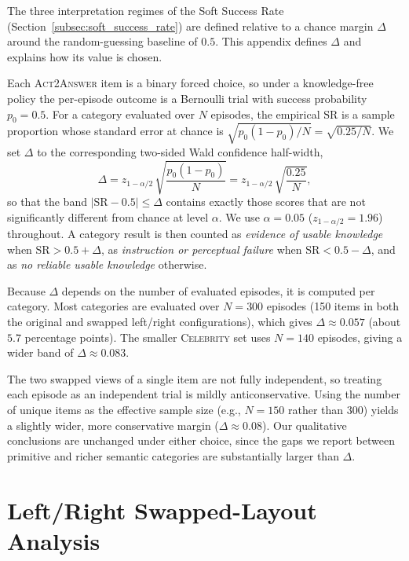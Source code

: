 \documentclass{llmxive}
\begin{document}
The three interpretation regimes of the Soft Success Rate (Section~\ref{subsec:soft_success_rate}) are defined relative to a chance margin $\Delta$ around the random-guessing baseline of $0.5$. This appendix defines $\Delta$ and explains how its value is chosen.

Each \textsc{Act2Answer} item is a binary forced choice, so under a knowledge-free policy the per-episode outcome is a Bernoulli trial with success probability $p_0 = 0.5$. For a category evaluated over $N$ episodes, the empirical $\mathrm{SR}$ is a sample proportion whose standard error at chance is $\sqrt{p_0(1-p_0)/N} = \sqrt{0.25/N}$. We set $\Delta$ to the corresponding two-sided Wald confidence half-width,
\begin{equation}
\Delta = z_{1-\alpha/2}\,\sqrt{\frac{p_0(1-p_0)}{N}} = z_{1-\alpha/2}\,\sqrt{\frac{0.25}{N}},
\end{equation}
so that the band $|\mathrm{SR}-0.5| \le \Delta$ contains exactly those scores that are not significantly different from chance at level $\alpha$. We use $\alpha = 0.05$ ($z_{1-\alpha/2} = 1.96$) throughout. A category result is then counted as \emph{evidence of usable knowledge} when $\mathrm{SR} > 0.5 + \Delta$, as \emph{instruction or perceptual failure} when $\mathrm{SR} < 0.5 - \Delta$, and as \emph{no reliable usable knowledge} otherwise.

Because $\Delta$ depends on the number of evaluated episodes, it is computed per category. Most categories are evaluated over $N = 300$ episodes (150 items in both the original and swapped left/right configurations), which gives $\Delta \approx 0.057$ (about $5.7$ percentage points). The smaller \textsc{Celebrity} set uses $N = 140$ episodes, giving a wider band of $\Delta \approx 0.083$.

The two swapped views of a single item are not fully independent, so treating each episode as an independent trial is mildly anticonservative. Using the number of unique items as the effective sample size (e.g., $N = 150$ rather than $300$) yields a slightly wider, more conservative margin ($\Delta \approx 0.08$). Our qualitative conclusions are unchanged under either choice, since the gaps we report between primitive and richer semantic categories are substantially larger than $\Delta$.

\section{Left/Right Swapped-Layout Analysis}
\label{appendix:left_right_swapped_layout}
\end{document}
